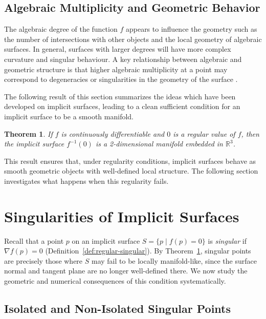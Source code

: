 \documentclass[12pt, a4paper, oneside]{book}
\theoremstyle{plain}
\newtheorem{theorem}{Theorem}[chapter]
\theoremstyle{definition}
\theoremstyle{remark}
\theoremstyle{definition}
\begin{document}
\subsection{Algebraic Multiplicity and Geometric Behavior}

The algebraic degree of the function $f$ appears to influence the geometry such as the number of intersections with other objects and the local geometry of algebraic surfaces. In general, surfaces with larger degrees will have more complex curvature and singular behaviour. A key relationship between algebraic and geometric structure is that higher algebraic multiplicity at a point may correspond to degeneracies or singularities in the geometry of the surface \cite{bloomenthal2000implicit}.

The following result of this section summarizes the ideas which have been developed on implicit surfaces, leading to a clean sufficient condition for an implicit surface to be a smooth manifold.

\begin{theorem}
\label{thm:manifold}
If $f$ is continuously differentiable and $0$ is a regular value of $f$, then the implicit surface $f^{-1}(0)$ is a 2-dimensional manifold embedded in $\mathbb{R}^3$.
\end{theorem}

This result ensures that, under regularity conditions, implicit surfaces behave as smooth geometric objects with well-defined local structure. The following section investigates what happens when this regularity fails.

\section{Singularities of Implicit Surfaces}
\label{sec:singularities}

Recall that a point $p$ on an implicit surface $S=\{p \mid f(p)=0\}$ is \emph{singular} if $\nabla f(p) = 0$ (Definition~\ref{def:regular-singular}). By Theorem~\ref{thm:manifold}, singular points are precisely those where $S$ may fail to be locally manifold-like, since the surface normal and tangent plane are no longer well-defined there. We now study the geometric and numerical consequences of this condition systematically.

\subsection{Isolated and Non-Isolated Singular Points}
\label{sec:isolated}
\end{document}
